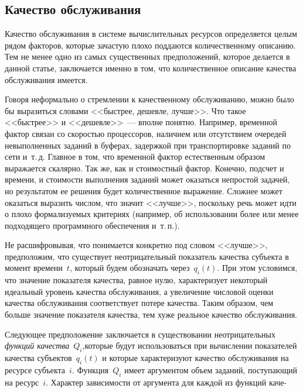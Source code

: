 \begin{multicols}{2}
\subsection{Качество обслуживания}

  Качество обслуживания в системе вычислительных ресурсов определяется целым рядом 
факторов, которые зачастую плохо поддаются количественному описанию. Тем не менее 
одно из самых существенных предположений, которое делается в данной статье, 
заключается именно в том, что количественное описание качества обслуживания имеется.
  
  Говоря неформально о стремлении к качественному обслуживанию, можно было бы 
выразиться словами <<быстрее, дешевле, лучше>>. Что такое <<быстрее>> и 
<<дешевле>>~--- вполне понятно. Например, временной фактор связан со скоростью 
процессоров, наличием или отсутствием очередей невыполненных заданий в буферах, 
задержкой при транспортировке заданий по сети и~т.\,д. Главное в том, что временной 
фактор естественным образом выражается скалярно. Так же, как и стоимостный фактор. 
Конечно, подсчет и времени, и стоимости выполнения заданий может оказаться непростой 
задачей, но результатом ее решения будет количественное выражение. Сложнее может 
оказаться выразить числом, что значит <<лучше>>, поскольку речь может идти о плохо 
формализуемых критериях (например, об использовании более или менее подходящего 
программного обеспечения и~т.\,п.).
   
   Не расшифровывая, что понимается конкретно под словом <<лучше>>, предположим, 
что существует неотрицательный показатель качества субъекта в момент времени~$t$, 
который будем обозначать через~$q_i(t)$. При этом условимся, что значение показателя 
качества, равное нулю, характеризует некоторый идеальный уровень качества обслуживания, а 
увеличение числовой оценки качества обслуживания соответствует потере качества. Таким 
образом, чем больше значение показателя качества, тем хуже реальное качество 
обслуживания.
   
    
   Следующее предположение заключается в существовании неотрицательных 
\textit{функций качества}~$Q_i$,\linebreak которые будут использоваться при вычислении\linebreak 
показателей качества субъектов~$q_i(t)$ и которые характеризуют качество обслуживания 
на ресурсе субъекта~$i$. Функция~$Q_i$ имеет аргументом объем заданий, поступающий на 
ресурс~$i$. Характер зависимости от аргумента для каждой из функций каче-\linebreak\vspace*{-12pt}
\pagebreak


\end{multicols}
